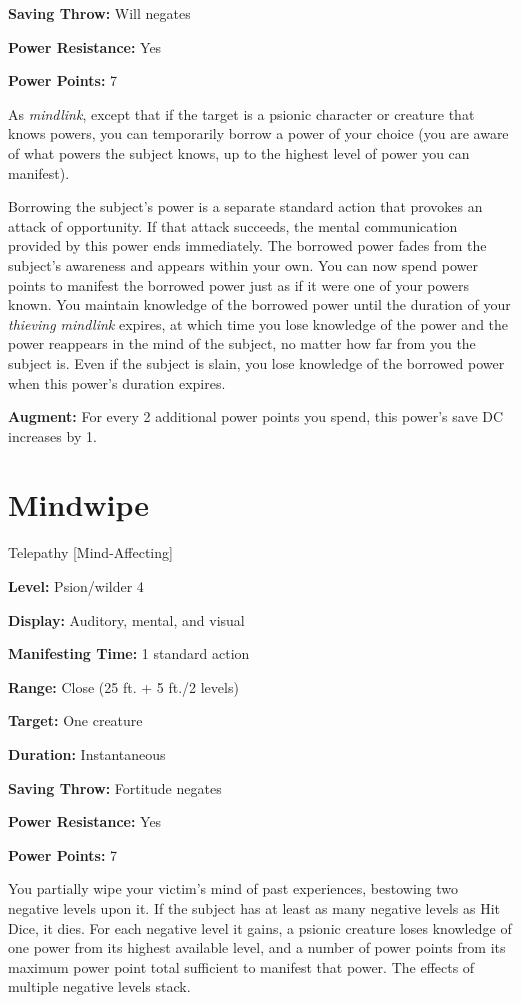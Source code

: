 \documentclass{article}
\begin{document}
\textbf{Saving Throw:} Will negates

\textbf{Power Resistance:} Yes

\textbf{Power Points:} 7

As \textit{mindlink}, except that if the target is a psionic character or creature 
that knows powers, you can temporarily borrow a power of your choice (you are aware 
of what powers the subject knows, up to the highest level of power you can manifest).

Borrowing the subject's power is a separate standard action that provokes an attack 
of opportunity. If that attack succeeds, the mental communication provided by this 
power ends immediately. The borrowed power fades from the subject's awareness and 
appears within your own. You can now spend power points to manifest the borrowed 
power just as if it were one of your powers known. You maintain knowledge of the 
borrowed power until the duration of your \textit{thieving mindlink }expires, at 
which time you lose knowledge of the power and the power reappears in the mind 
of the subject, no matter how far from you the subject is. Even if the subject 
is slain, you lose knowledge of the borrowed power when this power's duration expires.

\textbf{Augment:} For every 2 additional power points you spend, this power's save 
DC increases by 1.

\vspace{12pt}
\section*{Mindwipe}

Telepathy [Mind-Affecting]

\textbf{Level:} Psion/wilder 4

\textbf{Display:} Auditory, mental, and visual

\textbf{Manifesting Time:} 1 standard action

\textbf{Range:} Close (25 ft. + 5 ft./2 levels)

\textbf{Target:} One creature

\textbf{Duration:} Instantaneous

\textbf{Saving Throw:} Fortitude negates

\textbf{Power Resistance:} Yes

\textbf{Power Points:} 7

You partially wipe your victim's mind of past experiences, bestowing two negative 
levels upon it. If the subject has at least as many negative levels as Hit Dice, 
it dies. For each negative level it gains, a psionic creature loses knowledge of 
one power from its highest available level, and a number of power points from its 
maximum power point total sufficient to manifest that power. The effects of multiple 
negative levels stack.
\end{document}
